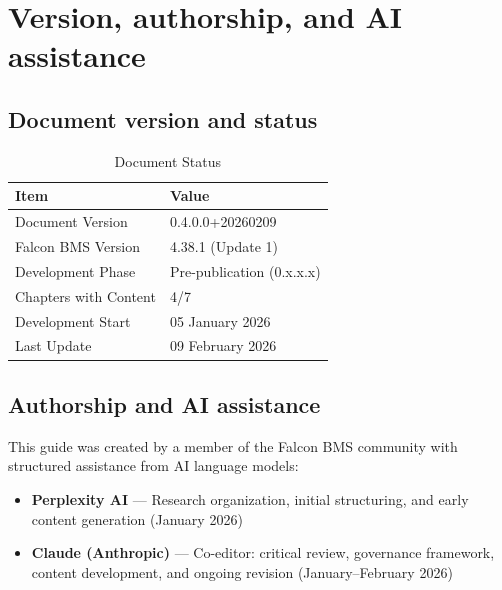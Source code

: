 \documentclass[11pt, a4paper, twoside]{report}
\newcommand{\docversion}{0.4.0.0}
\newcommand{\docbuild}{20260209}
\newcommand{\docstartdate}{05 January 2026}
\newcommand{\docenddate}{09 February 2026}
\newcommand{\chapterscompletedof}{4/7}
\newcommand{\fulldocversion}{\docversion+\docbuild}
\begin{document}
\section{Version, authorship, and AI assistance}
\label{sec:C1-S4}

\subsection{Document version and status}
\label{sec:C1-S4-S1}

\begin{table}[H]
	\centering
	\caption{Document Status}
	\label{tab:C1-doc-status}
	\small
	\renewcommand{\arraystretch}{1.25}
	\begin{tabular}{L{4.5cm} L{9.0cm}}
		\toprule
		\textbf{Item} & \textbf{Value} \\
		\midrule
		Document Version & \fulldocversion \\
		Falcon BMS Version & 4.38.1 (Update 1) \\
		Development Phase & Pre-publication (0.x.x.x) \\
		Chapters with Content & \chapterscompletedof \\
		Development Start & \docstartdate \\
		Last Update & \docenddate \\
		\bottomrule
	\end{tabular}
\end{table}

\subsection{Authorship and AI assistance}
\label{sec:C1-S4-S2}

This guide was created by a member of the Falcon BMS community with structured assistance from AI language models:

\begin{itemize}
	\item \textbf{Perplexity AI} --- Research organization, initial structuring, and early content generation (January 2026)
	\item \textbf{Claude (Anthropic)} --- Co-editor: critical review, governance framework, content development, and ongoing revision (January--February 2026)
\end{itemize}
\end{document}
